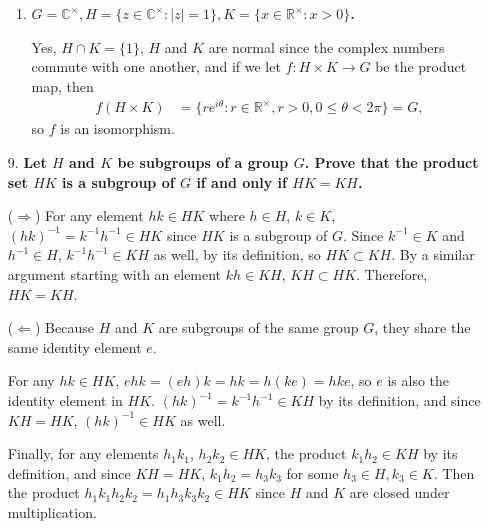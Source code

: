 \documentclass[a4paper,12pt]{article}
\begin{document}
\begin{enumerate}
\begin{enumerate}
            \item
                \boldmath
                \textbf{$G = \mathbb{C}^\times, H = \{ z \in \mathbb{C}^\times : |z| = 1 \}, K = \{ x \in \mathbb{R}^\times : x > 0 \}$.} \par
                \unboldmath
                Yes, $H \cap K = \{ 1 \}$, $H$ and $K$ are normal since the complex numbers commute with one another, and if we let $f : H \times K \to G$ be the product map, then
                \begin{align*}
                    f(H \times K) &= \{ re^{i\theta} : r \in \mathbb{R}^\times, r > 0, 0 \leq \theta < 2\pi \} = G,
                \end{align*}
                so $f$ is an isomorphism.
        \end{enumerate}
        \unboldmath

    \item[9.]
        \boldmath
        \textbf{Let $H$ and $K$ be subgroups of a group $G$. Prove that the product set $HK$ is a subgroup of $G$ if and only if $HK = KH$.} \par
        \unboldmath
        ($\Rightarrow$) For any element $hk \in HK$ where $h \in H$, $k \in K$, $(hk)^{-1} = k^{-1} h^{-1} \in HK$ since $HK$ is a subgroup of $G$. Since $k^{-1} \in K$ and $h^{-1} \in H$, $k^{-1} h^{-1} \in KH$ as well, by its definition, so $HK \subset KH$. By a similar argument starting with an element $kh \in KH$, $KH \subset HK$. Therefore, $HK = KH$. \par
        ($\Leftarrow$) Because $H$ and $K$ are subgroups of the same group $G$, they share the same identity element $e$. \par
        For any $hk \in HK$, $ehk = (eh)k = hk = h(ke) = hke$, so $e$ is also the identity element in $HK$. $(hk)^{-1} = k^{-1} h^{-1} \in KH$ by its definition, and since $KH = HK$, $(hk)^{-1} \in HK$ as well. \par
        Finally, for any elements $h_1 k_1$, $h_2 k_2 \in HK$, the product $k_1 h_2 \in KH$ by its definition, and since $KH = HK$, $k_1 h_2 = h_3 k_3$ for some $h_3 \in H, k_3 \in K$. Then the product $h_1 k_1 h_2 k_2 = h_1 h_3 k_3 k_2 \in HK$ since $H$ and $K$ are closed under multiplication.
\end{enumerate}
\end{document}
